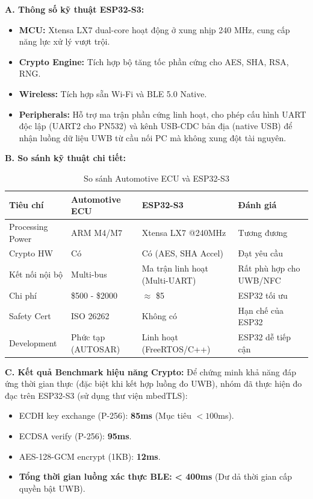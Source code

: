 \textbf{A. Thông số kỹ thuật ESP32-S3:}
\begin{itemize}
    \item \textbf{MCU:} Xtensa LX7 dual-core hoạt động ở xung nhịp 240 MHz, cung cấp năng lực xử lý vượt trội.
    \item \textbf{Crypto Engine:} Tích hợp bộ tăng tốc phần cứng cho AES, SHA, RSA, RNG.
    \item \textbf{Wireless:} Tích hợp sẵn Wi-Fi và BLE 5.0 Native.
    \item \textbf{Peripherals:} Hỗ trợ ma trận phần cứng linh hoạt, cho phép cấu hình UART độc lập (UART2 cho PN532) và kênh USB-CDC bản địa (native USB) để nhận luồng dữ liệu UWB từ cầu nối PC mà không xung đột tài nguyên.
\end{itemize}

\textbf{B. So sánh kỹ thuật chi tiết:}

\begin{table}[H]
\centering
\begin{tabularx}{\textwidth}{|l|X|X|X|}
\hline
\textbf{Tiêu chí} & \textbf{Automotive ECU} & \textbf{ESP32-S3} & \textbf{Đánh giá} \\ \hline
Processing Power & ARM M4/M7 & Xtensa LX7 @240MHz & Tương đương \\ \hline
Crypto HW & Có & Có (AES, SHA Accel) & Đạt yêu cầu \\ \hline
Kết nối nội bộ & Multi-bus & Ma trận linh hoạt (Multi-UART) & Rất phù hợp cho UWB/NFC \\ \hline
Chi phí & \$500 - \$2000 & $\approx$ \$5 & ESP32 tối ưu \\ \hline
Safety Cert & ISO 26262 & Không có & Hạn chế của ESP32 \\ \hline
Development & Phức tạp (AUTOSAR) & Linh hoạt (FreeRTOS/C++) & ESP32 dễ tiếp cận \\ \hline
\end{tabularx}
\caption{So sánh Automotive ECU và ESP32-S3}
\end{table}

\textbf{C. Kết quả Benchmark hiệu năng Crypto:}
Để chứng minh khả năng đáp ứng thời gian thực (đặc biệt khi kết hợp luồng đo UWB), nhóm đã thực hiện đo đạc trên ESP32-S3 (sử dụng thư viện mbedTLS):
\begin{itemize}
    \item ECDH key exchange (P-256): \textbf{85ms} (Mục tiêu $< 100$ms).
    \item ECDSA verify (P-256): \textbf{95ms}.
    \item AES-128-GCM encrypt (1KB): \textbf{12ms}.
    \item \textbf{Tổng thời gian luồng xác thực BLE:} \textbf{< 400ms} (Dư dả thời gian cấp quyền bật UWB).
\end{itemize}

